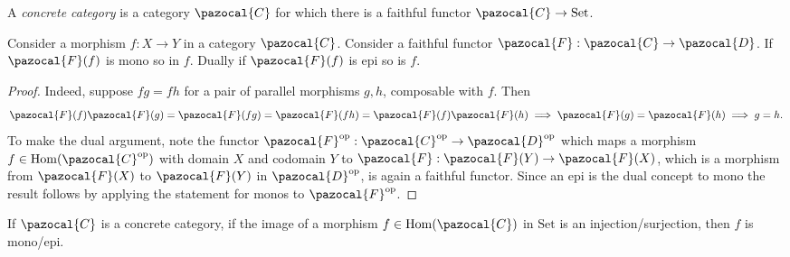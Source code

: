     \begin{definition}
        A \emph{concrete category} is a category $\pazocal{C}$ for which there is a faithful functor $\pazocal{C} \rightarrow \mathrm{Set}$.
    \end{definition}
    \begin{proposition}
        Consider a morphism $f: X\rightarrow Y$ in a category $\pazocal{C}$. Consider a faithful functor $\pazocal{F} : \pazocal{C}\rightarrow \pazocal{D}$. If $\pazocal{F}(f)$ is mono so in $f$. Dually if $\pazocal{F}(f)$ is epi so is $f$.
    \end{proposition}
    \begin{proof}
        Indeed, suppose $fg = fh$ for a pair of parallel morphisms $g,h$, composable with $f$. Then 
        $$\pazocal{F}(f)\pazocal{F}(g)= \pazocal{F}(fg) =\pazocal{F}(fh)  = \pazocal{F}(f)\pazocal{F}(h) \implies \pazocal{F}(g) = \pazocal{F}(h) \implies g=h.$$ 
        To make the dual argument, note the functor $\pazocal{F}\op : \pazocal{C}\op \rightarrow \pazocal{D}\op$ which maps a morphism $f\in \Hom(\pazocal{C}\op)$ with domain $X$ and codomain $Y$ to $\pazocal{F}: \pazocal{F}(Y) \rightarrow \pazocal{F}(X)$, which is a morphism from $\pazocal{F}(X)$ to $\pazocal{F}(Y)$ in $\pazocal{D}\op$, is again a faithful functor. Since an epi is the dual concept to mono the result follows by applying the statement for monos to $\pazocal{F}\op$.   
    \end{proof}
    \begin{corollary}
        If $\pazocal{C}$ is a concrete category, if the image of a morphism $f\in \Hom(\pazocal{C})$ in $\mathrm{Set}$ is an injection/surjection, then $f$ is mono/epi. 
    \end{corollary}
